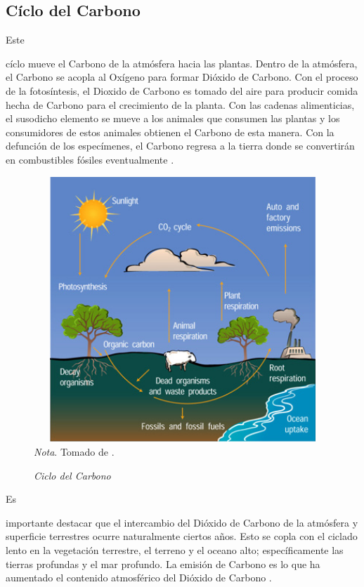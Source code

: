\documentclass[stu, 12pt, letterpaper, donotrepeattitle, floatsintext, natbib]{apa7}
\begin{document}
\subsection{Cíclo del Carbono}
Este \begin{justifying}
    cíclo mueve el Carbono de la atmósfera hacia las plantas. Dentro de la atmósfera, el Carbono se acopla al Oxígeno para formar Dióxido de Carbono. Con el proceso de la
    fotosíntesis, el Dioxido de Carbono es tomado del aire para producir comida hecha de Carbono para el crecimiento de la planta. Con las cadenas alimenticias, el susodicho elemento
    se mueve a los animales que consumen las plantas y los consumidores de estos animales obtienen el Carbono de esta manera. Con la defunción de los especímenes, el Carbono regresa a
    la tierra donde se convertirán en combustibles fósiles eventualmente \citep{openstax-no-date}.\par
\end{justifying}
\vspace{\baselineskip}
\begin{figure}[H]
    \caption{\emph{Ciclo del Carbono}}
    \centering
    \includegraphics[width=14cm,height=10cm]{carbon.jpg}
    \bigskip
    \\\small\textit{Nota}. Tomado de \cite{openstax-no-date}. %
\end{figure}
Es \begin{justifying}
    importante destacar que el intercambio del Dióxido de Carbono de la atmósfera y superficie terrestres ocurre naturalmente ciertos años. Esto se copla con el ciclado lento en la vegetación terrestre,
    el terreno y el oceano alto; específicamente las tierras profundas y el mar profundo. La emisión de Carbono es lo que ha aumentado el contenido atmosférico del Dióxido de Carbono \cite{stocker-2013}. 
\end{justifying}
\vspace{\baselineskip}
\end{document}
